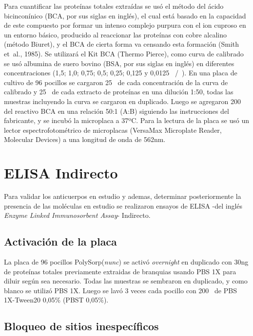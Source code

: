 \documentclass[12pt,letterpaper,oneside]{scrbook}
\begin{document}
Para cuantificar las proteínas totales extraídas se usó el método del
ácido bicinconínico (BCA, por sus siglas en inglés), el cual está basado
en la capacidad de este compuesto por formar un intenso complejo purpura
con el ion cuproso en un entorno básico, producido al reaccionar las
proteínas con cobre alcalino (método Biuret), y el BCA de cierta forma
va censando esta formación (Smith et~al., 1985). Se utilizará el Kit BCA
(Thermo Pierce), como curva de calibrado se usó albumina de suero bovino
(BSA, por sus siglas en inglés) en diferentes concentraciones (1,5; 1,0;
0,75; 0,5; 0,25; 0,125 y 0,0125 \si{\micro\gramo}/\si{\micro\litro}). En
una placa de cultivo de 96 pocillos se cargaron 25\si{\micro\litro} de
cada concentración de la curva de calibrado y 25\si{\micro\litro} de
cada extracto de proteínas en una dilución 1:50, todas las muestras
incluyendo la curva se cargaron en duplicado. Luego se agregaron 200
\si{\micro\litro} del reactivo BCA en una relación 50:1 (A:B) siguiendo
las instrucciones del fabricante, y se incubó la microplaca a 37ºC. Para
la lectura de la placa se usó un lector espectrofotométrico de
microplacas (VersaMax Microplate Reader, Molecular Devices) a una
longitud de onda de 562nm.

\section{ELISA Indirecto}\label{ELISAs}

Para validar los anticuerpos en estudio y ademas, determinar
posteriormente la presencia de las moléculas en estudio se realizaron
ensayos de ELISA -del inglés \emph{Enzyme Linked Immunosorbent Assay}-
Indirecto.

\subsection{Activación de la placa}

La placa de 96 pocillos
PolySorp\textregistered (\emph{nunc\texttrademark}) se activó
\emph{overnight} en duplicado con 30ng de proteínas totales previamente
extraidas de branquias usando PBS 1X para diluir según sea necesario.
Todas las muestras se sembraron en duplicado, y como blanco se utilizó
PBS 1X. Luego se lavó 3 veces cada pocillo con 200\si{\micro\litro} de
PBS 1X-Tween20 0,05\% (PBST 0,05\%).

\subsection{Bloqueo de sitios inespecíficos}
\end{document}
